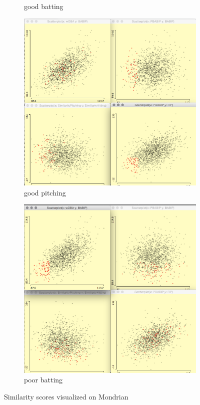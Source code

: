 \documentclass[12pt]{article}
\numberwithin{equation}{subsection}
\begin{document}
\begin{figure}[H]
\begin{subfigure}[b]{0.5\linewidth}
    \caption{good batting} 
    \label{fig5:b} 
    \vspace{4ex}
  \end{subfigure} 
  \begin{subfigure}[b]{0.5\linewidth}
    \centering
    \includegraphics[width=0.9\linewidth]{m3} 
    \caption{good pitching} 
    \label{fig5:c} 
  \end{subfigure}%
  \begin{subfigure}[b]{0.5\linewidth}
    \centering
    \includegraphics[width=0.9\linewidth]{m4} 
    \caption{poor batting} 
    \label{fig5:d} 
  \end{subfigure} 
  \caption{Similarity scores visualized on Mondrian}
  \label{fig50} 
\end{figure}
\end{document}
